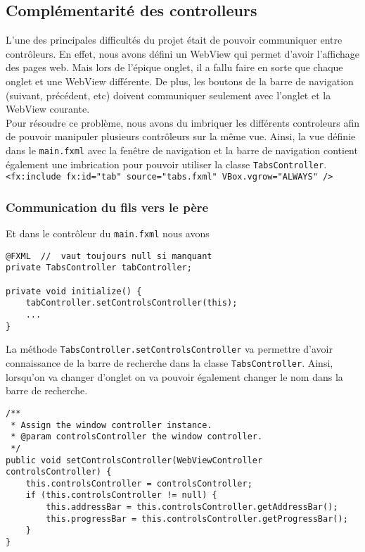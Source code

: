 \documentclass[10pt,a4paper]{article}
\begin{document}
\newpage

\subsection{Complémentarité des controlleurs}
L'une des principales difficultés du projet était de pouvoir communiquer entre contrôleurs. En effet, nous avons défini un WebView qui permet d'avoir l'affichage des pages web. Mais lors de l'épique onglet, il a fallu faire en sorte que chaque onglet et une WebView différente. De plus, les boutons de la barre de navigation (suivant, précédent, etc) doivent communiquer seulement avec l'onglet et la WebView courante. \\

Pour résoudre ce problème, nous avons du imbriquer les différents controleurs afin de pouvoir manipuler plusieurs contrôleurs sur la même vue. Ainsi, la vue définie dans le \verb|main.fxml| avec la fenêtre de navigation et la barre de navigation contient également une imbrication pour pouvoir utiliser la classe \verb|TabsController|. \\
\verb|<fx:include fx:id="tab" source="tabs.fxml" VBox.vgrow="ALWAYS" />|

\subsubsection{Communication du fils vers le père}
Et dans le contrôleur du \verb|main.fxml| nous avons
\begin{lstlisting}
@FXML  //  vaut toujours null si manquant
private TabsController tabController;

private void initialize() {
	tabController.setControlsController(this);
	...
}
\end{lstlisting}

La méthode \verb|TabsController.setControlsController| va permettre d'avoir connaissance de la barre de recherche dans la classe \verb|TabsController|. Ainsi, lorsqu'on va changer d'onglet on va pouvoir également changer le nom dans la barre de recherche.
\begin{lstlisting}
/**
 * Assign the window controller instance.
 * @param controlsController the window controller.
 */
public void setControlsController(WebViewController controlsController) {
	this.controlsController = controlsController;
	if (this.controlsController != null) {
		this.addressBar = this.controlsController.getAddressBar();
		this.progressBar = this.controlsController.getProgressBar();
	}
}
\end{lstlisting}
\end{document}
